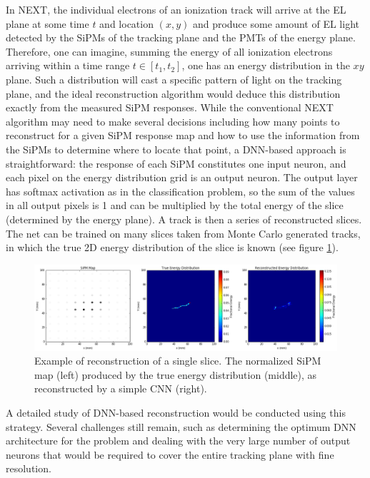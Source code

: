 \documentclass[11pt,a4paper]{article}
\begin{document}
In NEXT, the individual electrons of an ionization track will arrive at the EL plane at some time $t$ and location $(x,y)$ and produce some amount of EL light detected by the SiPMs of the tracking plane and the PMTs of the energy plane. Therefore, one can imagine, summing the energy of all ionization electrons arriving within a time range $t \in [t_1,t_2]$, one has an energy distribution in the $xy$ plane. Such a distribution will cast a specific pattern of light on the tracking plane, and the ideal reconstruction algorithm would deduce this distribution exactly from the measured SiPM responses. While the conventional NEXT algorithm may need to make several decisions including how many points to reconstruct for a given SiPM response map and how to use the information from the SiPMs to determine where to locate that point, a DNN-based approach is straightforward: the response of each SiPM constitutes one input neuron, and each pixel on the energy distribution grid is an output neuron. The output layer has softmax activation as in the classification problem, so the sum of the values in all output pixels is 1 and can be multiplied by the total energy of the slice (determined by the energy plane). A track is then a series of reconstructed slices. The net can be trained on many slices taken from Monte Carlo generated tracks, in which the true 2D energy distribution of the slice is known (see figure \ref{fig.reconst_example}).

\begin{figure}[!htb]
	\centering
	\includegraphics[scale=0.41]{fig/reconst_example_evt1.png}
	\caption{\label{fig.reconst_example}Example of reconstruction of a single slice. The normalized SiPM map (left) produced by the true energy distribution (middle), as reconstructed by a simple CNN (right).}
\end{figure}

A detailed study of DNN-based reconstruction would be conducted using this strategy. Several challenges still remain, such as determining the optimum DNN architecture for the problem and dealing with the very large number of output neurons that would be required to cover the entire tracking plane with fine resolution.
\end{document}
